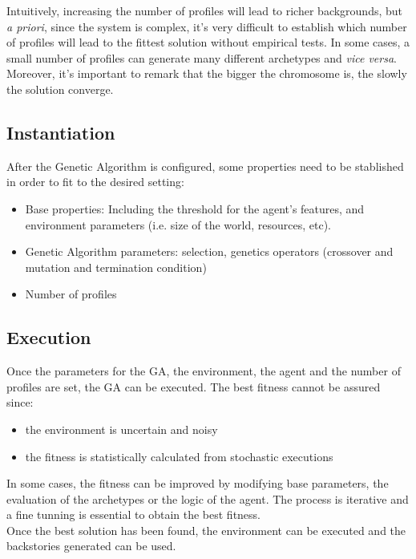 \documentclass{sig-alternate}
\begin{document}
Intuitively, increasing the number of profiles will lead to richer backgrounds, but \textit{a priori}, since the system is complex, it's very difficult to establish which number of profiles will lead to the fittest solution without empirical tests. In some cases, a small number of profiles can generate many different archetypes and \textit{vice versa}. Moreover, it's important to remark that the bigger the chromosome is, the slowly the solution converge.


\subsection{Instantiation}

After the Genetic Algorithm is configured, some properties need to be stablished in order to fit to the desired setting:
\begin{itemize}
\item Base properties: Including the threshold for the agent's features, and environment parameters (i.e. size of the world, resources, etc).
\item Genetic Algorithm parameters: selection, genetics operators (crossover and mutation and termination condition)
\item Number of profiles
\end{itemize}

\subsection{Execution}

Once the parameters for the GA, the environment, the agent and the number of profiles are set, the GA can be executed.
The best fitness cannot be assured since:
\begin{itemize}
\item the environment is uncertain and noisy
\item the fitness is statistically calculated from stochastic executions
\end{itemize}

In some cases, the fitness can be improved by modifying base parameters, the evaluation of the archetypes or the logic of the agent. The process is iterative and a fine tunning is essential to obtain the best fitness.\\

Once the best solution has been found, the environment can be executed and the backstories generated can be used.
\end{document}
